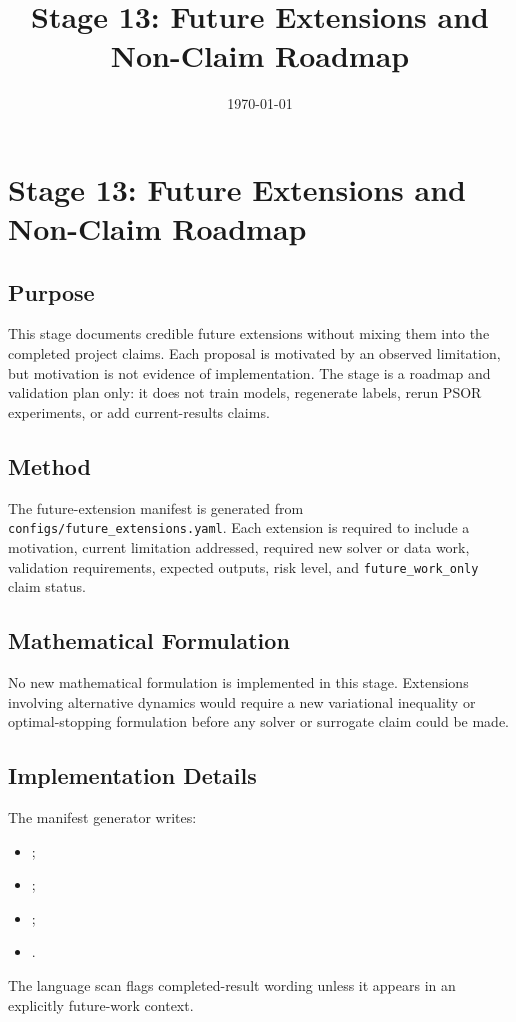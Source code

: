 \documentclass[11pt]{article}
\title{Stage 13: Future Extensions and Non-Claim Roadmap}
\date{\today}
\begin{document}
\maketitle

\section{Stage 13: Future Extensions and Non-Claim Roadmap}

\subsection{Purpose}
This stage documents credible future extensions without mixing them into the
completed project claims. Each proposal is motivated by an observed limitation,
but motivation is not evidence of implementation. The stage is a roadmap and
validation plan only: it does not train models, regenerate labels, rerun PSOR
experiments, or add current-results claims.

\subsection{Method}
The future-extension manifest is generated from \texttt{configs/future\_extensions.yaml}. Each extension is required to include a motivation, current limitation addressed, required new solver or data work, validation requirements, expected outputs, risk level, and \texttt{future\_work\_only} claim status.

\subsection{Mathematical Formulation}
No new mathematical formulation is implemented in this stage. Extensions involving alternative dynamics would require a new variational inequality or optimal-stopping formulation before any solver or surrogate claim could be made.

\subsection{Implementation Details}
The manifest generator writes:
\begin{itemize}
  \item {};
  \item {};
  \item {};
  \item {}.
\end{itemize}
The language scan flags completed-result wording unless it appears in an
explicitly future-work context.
\end{document}
